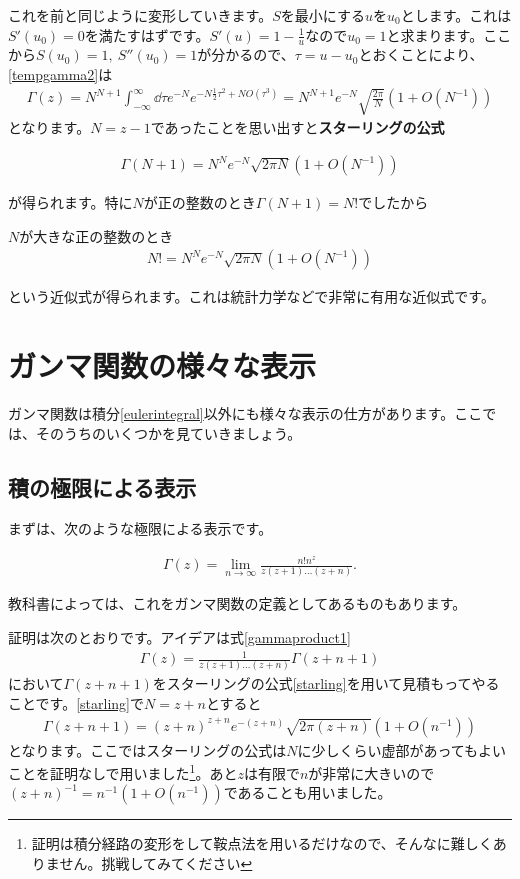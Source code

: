 \documentclass[report,paper=a4, fontsize=12pt, line_length=16cm, number_of_lines=33,dvipdfmx]{jlreq}
\newenvironment{important}{\begin{tcolorbox}[
  colback = white,
  colframe = red!35,
  boxrule = 2mm,
  fonttitle = \bfseries,
  after = \noindent] }{\end{tcolorbox}}
\numberwithin{equation}{section}
\newcommand{\strong}[1]{\textsf{\bfseries #1}}
\begin{document}
これを前と同じように変形していきます。$S$を最小にする$u$を$u_0$とします。これは$S'(u_0)=0$を満たすはずです。$S'(u)=1-\frac{1}{u}$なので$u_0=1$と求まります。ここから$S(u_0)=1,\ S''(u_0)=1$が分かるので、$\tau=u-u_0$とおくことにより、\eqref{tempgamma2}は
\begin{align}
  \Gamma(z)=N^{N+1}\int_{-\infty}^{\infty}\dd{\tau}e^{-N}e^{-N\frac12 \tau^2+NO(\tau^3)}=N^{N+1}e^{-N}\sqrt{\frac{2\pi}{N}}(1+O(N^{-1}))
\end{align}
となります。$N=z-1$であったことを思い出すと\strong{スターリングの公式}
\begin{important}
  \begin{align}
    \Gamma(N+1)=N^{N}e^{-N}\sqrt{2\pi N}(1+O(N^{-1}))\label{starling}
  \end{align}
\end{important}
が得られます。特に$N$が正の整数のとき$\Gamma(N+1)=N!$でしたから
\begin{important}
  $N$が大きな正の整数のとき
\begin{align}
  N!=N^{N}e^{-N}\sqrt{2\pi N}(1+O(N^{-1}))\label{starling2}
\end{align}
\end{important}
という近似式が得られます。これは統計力学などで非常に有用な近似式です。

\section{ガンマ関数の様々な表示}
ガンマ関数は積分\eqref{eulerintegral}以外にも様々な表示の仕方があります。ここでは、そのうちのいくつかを見ていきましょう。
\subsection{積の極限による表示}
まずは、次のような極限による表示です。
\begin{important}
  \begin{align}
    \Gamma(z)=\lim_{n\to\infty}\frac{n!n^z}{z(z+1)\dots (z+n)}.
    \label{gammaproductlimit}
  \end{align}
\end{important}
教科書によっては、これをガンマ関数の定義としてあるものもあります。

証明は次のとおりです。アイデアは式\eqref{gammaproduct1}
\begin{align}
  \Gamma(z)=\frac{1}{z(z+1)\dots (z+n)}\Gamma(z+n+1)
  \label{gammaproduct1re}
\end{align}
において$\Gamma(z+n+1)$をスターリングの公式\eqref{starling}を用いて見積もってやることです。\eqref{starling}で$N=z+n$とすると
\begin{align}
  \Gamma(z+n+1)=(z+n)^{z+n}e^{-(z+n)}\sqrt{2\pi(z+n)}(1+O(n^{-1}))
  \label{tempgammaproduct1}
\end{align}
となります。ここではスターリングの公式は$N$に少しくらい虚部があってもよいことを証明なしで用いました\footnote{証明は積分経路の変形をして鞍点法を用いるだけなので、そんなに難しくありません。挑戦してみてください}。あと$z$は有限で$n$が非常に大きいので$(z+n)^{-1}=n^{-1}(1+O(n^{-1}))$であることも用いました。
\end{document}
